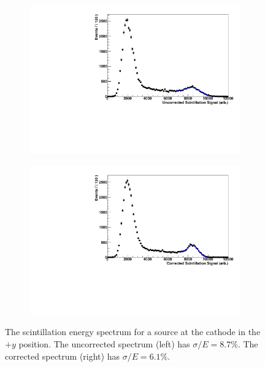 \documentclass[herrin-thesis.tex]{subfiles}
\begin{document}
\begin{figure}[tbh]
\centering
\begin{subfigure}[b]{0.48\textwidth}
\centering
\includegraphics[width=\textwidth]{./plots/lightmap_spectrum_uncorrected.pdf}
\end{subfigure}\hfill%
\begin{subfigure}[b]{0.48\textwidth}
\centering
\includegraphics[width=\textwidth]{./plots/lightmap_spectrum_corrected.pdf}
\end{subfigure}
\caption[Scintillation spectrum before and after correction]{The scintillation energy spectrum for a  source at the cathode in the \(+y\) position. The uncorrected spectrum (left) has \(\sigma/E = 8.7\%\). The corrected spectrum (right) has \(\sigma/E = 6.1\%\).}
\label{fig:lightmap_improvement}
\end{figure}
\end{document}
